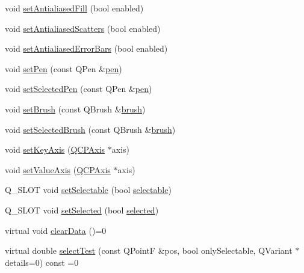 \begin{DoxyCompactItemize}
void \hyperlink{classQCPAbstractPlottable_a089d6b5577120239b55c39ed27c39536}{set\+Antialiased\+Fill} (bool enabled)
\item 
void \hyperlink{classQCPAbstractPlottable_a2f03f067ede2ed4da6f7d0e4777a3f02}{set\+Antialiased\+Scatters} (bool enabled)
\item 
void \hyperlink{classQCPAbstractPlottable_a757beb744b96cf1855cca5ab9d3ecf52}{set\+Antialiased\+Error\+Bars} (bool enabled)
\item 
void \hyperlink{classQCPAbstractPlottable_ab74b09ae4c0e7e13142fe4b5bf46cac7}{set\+Pen} (const Q\+Pen \&\hyperlink{classQCPAbstractPlottable_a41d060007cc6b3037c9c04d22d0c0398}{pen})
\item 
void \hyperlink{classQCPAbstractPlottable_a6911603cad23ab0469b108224517516f}{set\+Selected\+Pen} (const Q\+Pen \&\hyperlink{classQCPAbstractPlottable_a41d060007cc6b3037c9c04d22d0c0398}{pen})
\item 
void \hyperlink{classQCPAbstractPlottable_a7a4b92144dca6453a1f0f210e27edc74}{set\+Brush} (const Q\+Brush \&\hyperlink{classQCPAbstractPlottable_aa74cdceb9c7286ef116fbfa58e0326e7}{brush})
\item 
void \hyperlink{classQCPAbstractPlottable_ae8c816874089f7a44001e8618e81a9dc}{set\+Selected\+Brush} (const Q\+Brush \&\hyperlink{classQCPAbstractPlottable_aa74cdceb9c7286ef116fbfa58e0326e7}{brush})
\item 
void \hyperlink{classQCPAbstractPlottable_a8524fa2994c63c0913ebd9bb2ffa3920}{set\+Key\+Axis} (\hyperlink{classQCPAxis}{Q\+C\+P\+Axis} $\ast$axis)
\item 
void \hyperlink{classQCPAbstractPlottable_a71626a07367e241ec62ad2c34baf21cb}{set\+Value\+Axis} (\hyperlink{classQCPAxis}{Q\+C\+P\+Axis} $\ast$axis)
\item 
Q\+\_\+\+S\+L\+OT void \hyperlink{classQCPAbstractPlottable_a22c69299eb5569e0f6bf084877a37dc4}{set\+Selectable} (bool \hyperlink{classQCPAbstractPlottable_af895574da1ec0d050711b6c9deda296a}{selectable})
\item 
Q\+\_\+\+S\+L\+OT void \hyperlink{classQCPAbstractPlottable_afbd5428c2952f59d952e11ab5cd79176}{set\+Selected} (bool \hyperlink{classQCPAbstractPlottable_ab901903adcb0e29467d63de72340ab29}{selected})
\item 
virtual void \hyperlink{classQCPAbstractPlottable_a86e5b8fd4b6ff4f4084e7ea4c573fc53}{clear\+Data} ()=0
\item 
virtual double \hyperlink{classQCPAbstractPlottable_a38efe9641d972992a3d44204bc80ec1d}{select\+Test} (const Q\+PointF \&pos, bool only\+Selectable, Q\+Variant $\ast$details=0) const =0

\end{DoxyCompactItemize}
